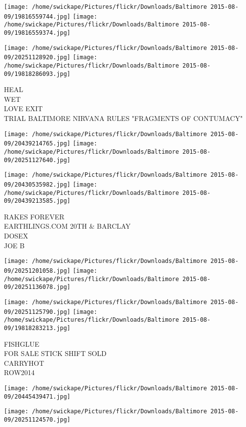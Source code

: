 \documentclass[10pt,letterpaper]{article}
\begin{document}
\texttt{[image: /home/swickape/Pictures/flickr/Downloads/Baltimore 2015-08-09/19816559744.jpg]}
\texttt{[image: /home/swickape/Pictures/flickr/Downloads/Baltimore 2015-08-09/19816559374.jpg]}

\texttt{[image: /home/swickape/Pictures/flickr/Downloads/Baltimore 2015-08-09/20251128920.jpg]}
\texttt{[image: /home/swickape/Pictures/flickr/Downloads/Baltimore 2015-08-09/19818286093.jpg]}

HEAL\\
WET\\
LOVE EXIT\\
TRIAL BALTIMORE NIRVANA RULES "FRAGMENTS OF CONTUMACY"\\
\pagebreak

\texttt{[image: /home/swickape/Pictures/flickr/Downloads/Baltimore 2015-08-09/20439214765.jpg]}
\texttt{[image: /home/swickape/Pictures/flickr/Downloads/Baltimore 2015-08-09/20251127640.jpg]}

\texttt{[image: /home/swickape/Pictures/flickr/Downloads/Baltimore 2015-08-09/20430535982.jpg]}
\texttt{[image: /home/swickape/Pictures/flickr/Downloads/Baltimore 2015-08-09/20439213585.jpg]}

RAKES FOREVER\\
EARTHLINGS.COM 20TH \& BARCLAY\\
DOSEX\\
JOE B\\
\pagebreak

\texttt{[image: /home/swickape/Pictures/flickr/Downloads/Baltimore 2015-08-09/20251201058.jpg]}
\texttt{[image: /home/swickape/Pictures/flickr/Downloads/Baltimore 2015-08-09/20251136078.jpg]}

\texttt{[image: /home/swickape/Pictures/flickr/Downloads/Baltimore 2015-08-09/20251125790.jpg]}
\texttt{[image: /home/swickape/Pictures/flickr/Downloads/Baltimore 2015-08-09/19818283213.jpg]}

FISHGLUE\\
FOR SALE STICK SHIFT SOLD\\
CARRYHOT\\
ROW2014\\
\pagebreak

\texttt{[image: /home/swickape/Pictures/flickr/Downloads/Baltimore 2015-08-09/20445439471.jpg]}

\vspace{0.25in}
\texttt{[image: /home/swickape/Pictures/flickr/Downloads/Baltimore 2015-08-09/20251124570.jpg]}
\end{document}
